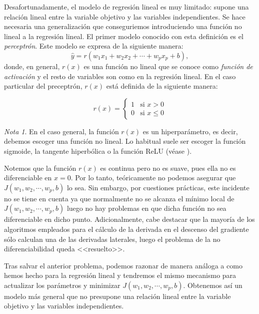 \documentclass[12pt, a4paper, twoside]{book}
\numberwithin{equation}{section}
\theoremstyle{definition}
\theoremstyle{remark}
\newtheorem*{remark}{Nota}
\theoremstyle{plain}
\begin{document}
	Desafortunadamente, el modelo de regresión lineal es muy limitado: 
	supone una relación lineal entre la variable objetivo y las variables
	independientes. Se hace necesaria una generalización que conseguriemos
	introduciendo una función no lineal a la regresión lineal. El primer
	modelo conocido con esta definición es el \emph{perceptrón}. Este 
	modelo se expresa de la siguiente manera:
	\begin{equation*}
		\hat{y}=r(w_{1}x_{1}+w_{2}x_{2}+\cdots+w_{p}x_{p}+b),
	\end{equation*}
	donde, en general, $r(x)$ es una función no lineal que se conoce como 
	\emph{función de activación} y el resto de variables son como en la 
	regresión lineal. En el caso particular del preceptrón, $r(x)$ está 
	definida de la siguiente manera:
	
	\begin{equation}
		\label{def:r}
		r(x)=\left \{
			\begin{array}{ll}
				1&\text{si }x>0\\
				0&\text{si }x\leq0
			\end{array} 
		     \right .
	\end{equation}

	\begin{remark}
	En el caso general, la función $r(x)$ es un hiperparámetro, es decir,
	debemos escoger una función no lineal. Lo habitual suele ser escoger
	la función sigmoide, la tangente hiperbólica o la función ReLU (véase 
	\cite{Goodfellow-et-al-2016}).
	\end{remark}
	
	Notemos que la función $r(x)$ es continua pero no es suave, pues ella
	no es diferenciable en $x=0$. Por lo tanto, teóricamente no podemos 
	asegurar que $J(w_{1},w_{2},\cdots,w_{p},b)$ lo sea. Sin embargo, por 
	cuestiones prácticas, 
	este incidente no se tiene en cuenta ya que normalmente no se alcanza
	el mínimo local de $J(w_{1},w_{2},\cdots,w_{p},b)$ luego no hay 
	problemas en que dicha 
	función no sea diferenciable en dicho punto. Adicionalmente, cabe 
	destacar que la mayoría de los algoritmos empleados para el cálculo de 
	la derivada en el descenso del gradiente sólo calculan una de las 
	derivadas laterales, luego el problema de la no diferenciabilidad 
	queda <<resuelto>>.

	Tras salvar el anterior problema, podemos razonar de manera análoga
	a como hemos hecho para la regresión lineal y tendremos el mismo 
	mecanismo para actualizar los parámetros y minimizar $J(w_{1},w_{2},
	\cdots,w_{p},b)$. 
	Obtenemos así un modelo más general que no presupone una relación 
	lineal entre la variable objetivo y las variables independientes. 
	
\end{document}
